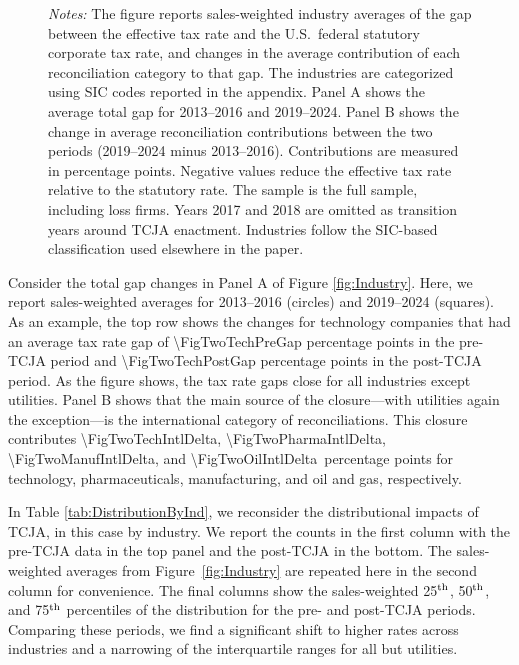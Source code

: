\documentclass[11pt,letterpaper]{article}
\newcommand{\ShareNum}[1]{\num[round-mode=places,round-precision=1]{#1}}
\begin{document}
\begin{figure}[!tp]
\begin{minipage}{0.95\textwidth}
\footnotesize
\textit{Notes:} 
The figure reports sales-weighted industry averages of the gap between the
effective tax rate and the U.S.\ federal statutory corporate tax rate, and changes in the
average contribution of each reconciliation category to that gap. 
The industries are categorized using SIC codes reported in the appendix.
Panel A shows the average
total gap for 2013--2016 and 2019--2024. Panel B shows the change in average reconciliation
contributions between the two periods (2019--2024 minus 2013--2016). Contributions are
measured in percentage points. Negative values reduce the effective tax rate relative to
the statutory rate. The sample is the full sample, including loss firms. Years 2017 and
2018 are omitted as transition years around TCJA enactment. Industries follow the SIC-based
classification used elsewhere in the paper.
\end{minipage}

\bigskip
\bigskip
\end{figure}




Consider the total gap changes in Panel A of Figure \ref{fig:Industry}.
Here, we report sales-weighted averages for 2013--2016 (circles)
and 2019--2024 (squares).  As an example, the top row shows the changes
for technology companies that had an average tax rate gap of 
\ShareNum{\FigTwoTechPreGap} percentage points in the pre-TCJA period and
\ShareNum{\FigTwoTechPostGap} percentage points in the post-TCJA period.
As the figure shows, the tax rate gaps close for all industries except utilities.
Panel B shows that the main source of the closure---with utilities again
the exception---is the international category of reconciliations.
This closure contributes \ShareNum{\FigTwoTechIntlDelta},
\ShareNum{\FigTwoPharmaIntlDelta}, \ShareNum{\FigTwoManufIntlDelta}, and
\ShareNum{\FigTwoOilIntlDelta}\ percentage points for technology,
pharmaceuticals, manufacturing, and oil and gas, respectively.

In Table \ref{tab:DistributionByInd}, we reconsider the distributional
impacts of TCJA, in this case by industry.
We report the counts in the first column with the pre-TCJA data
in the top panel and the post-TCJA in the bottom.
The sales-weighted averages from Figure~\ref{fig:Industry}
are repeated here in the second column for convenience.
The final columns show the sales-weighted 25$^{\rm th}$, 50$^{\rm th}$,
and 75$^{\rm th}$ percentiles of the distribution for the
pre- and post-TCJA periods.
Comparing these periods, we find a significant shift to 
higher rates across industries and a narrowing of the interquartile
ranges for all but utilities. 
\end{document}
